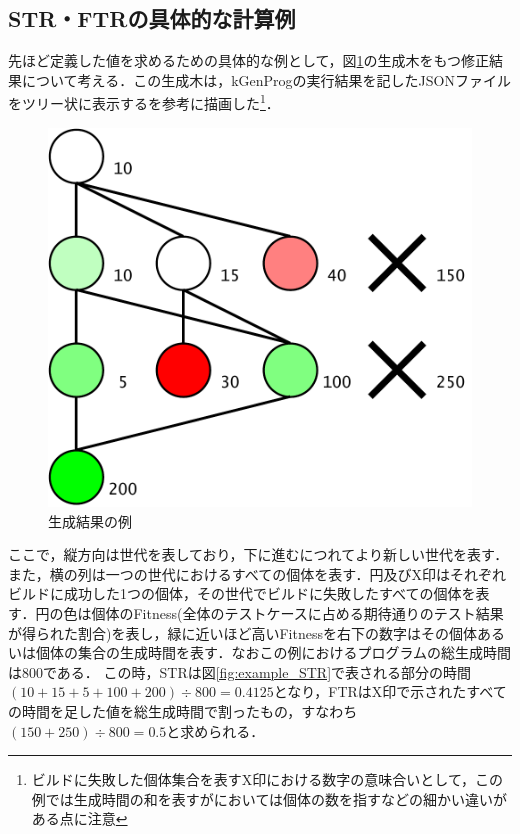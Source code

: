 \documentclass[uplatex,dvipdfmx,a4paper]{jsarticle}
\let\oldcite\cite
\renewcommand{\cite}[1]{\xspace\oldcite{#1}}
\begin{document}
\subsection{STR・FTRの具体的な計算例}
先ほど定義した値を求めるための具体的な例として，図\ref{fig:example}の生成木をもつ修正結果について考える．この生成木は，kGenProgの実行結果を記したJSONファイルをツリー状に表示する\mcw \cite{tomida2019visualizing}を参考に描画した\footnote{ビルドに失敗した個体集合を表すX印における数字の意味合いとして，この例では生成時間の和を表すが\mcw においては個体の数を指すなどの細かい違いがある点に注意}．
\begin{figure}[t]
  \centering
  \includegraphics[width=\linewidth]{fig/astSample.pdf}
  \caption{生成結果の例}
  \label{fig:example}
\end{figure}
ここで，縦方向は世代を表しており，下に進むにつれてより新しい世代を表す．また，横の列は一つの世代におけるすべての個体を表す．円及びX印はそれぞれビルドに成功した1つの個体，その世代でビルドに失敗したすべての個体を表す．円の色は個体のFitness(全体のテストケースに占める期待通りのテスト結果が得られた割合)を表し，緑に近いほど高いFitnessを右下の数字はその個体あるいは個体の集合の生成時間を表す．なおこの例におけるプログラムの総生成時間は800である．
この時，STRは図\ref{fig:example_STR}で表される部分の時間$(10 + 15 + 5 + 100 + 200) \div 800 = 0.4125$となり，FTRはX印で示されたすべての時間を足した値を総生成時間で割ったもの，すなわち$(150 + 250) \div 800 = 0.5$と求められる．
\end{document}
